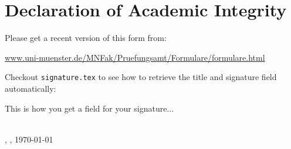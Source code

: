 \chapter*{Declaration of Academic Integrity}
Please get a recent version of this form from:

\url{www.uni-muenster.de/MNFak/Pruefungsamt/Formulare/formulare.html}


Checkout \texttt{signature.tex} to see how to retrieve the title and signature field automatically:

\begin{center}
\textit{\printtitle}
\end{center}


This is how you get a field for your signature...


\vspace{0.75cm}
\parbox{17em}{\hrulefill} \\
\printname, \printcity, \today


